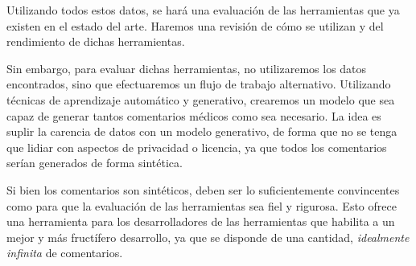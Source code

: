 Utilizando todos estos datos, se hará una evaluación de las herramientas que ya existen en el estado del arte. Haremos una revisión de cómo se utilizan y del rendimiento de dichas herramientas. 

Sin embargo, para evaluar dichas herramientas, no utilizaremos los datos encontrados, sino que efectuaremos un flujo de trabajo alternativo. Utilizando técnicas de aprendizaje automático y generativo, crearemos un modelo que sea capaz de generar tantos comentarios médicos como sea necesario. La idea es suplir la carencia de datos con un modelo generativo, de forma que no se tenga que lidiar con aspectos de privacidad o licencia, ya que todos los comentarios serían generados de forma sintética. 

Si bien los comentarios son sintéticos, deben ser lo suficientemente convincentes como para que la evaluación de las herramientas sea fiel y rigurosa. Esto ofrece una herramienta para los desarrolladores de las herramientas que habilita a un mejor y más fructífero desarrollo, ya que se disponde de una cantidad, \textit{idealmente infinita} de comentarios.



